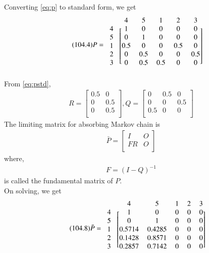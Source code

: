 \documentclass[journal,12pt,twocolumn]{IEEEtran}
\begin{document}
Converting \eqref{eq:p} to standard form, we get
\begin{align}
\tag{104.4}
\label{eq:pstd}
    P=\begin{blockarray}{cccccc}
&4 & 5 & 1 & 2 & 3 \\
\begin{block}{c[ccccc]}
  4 & 1 & 0 & 0 & 0 & 0 \\
  5 & 0 & 1 & 0 & 0 & 0 \\
  1 & 0.5 & 0 & 0 & 0.5 & 0 \\
  2 & 0 & 0.5 & 0 & 0 & 0.5 \\
  3 & 0 & 0.5 & 0.5 & 0 & 0 \\
\end{block}
\end{blockarray}
\end{align}
From \eqref{eq:pstd},
\begin{align}
\tag{104.5}
\label{eq:r,q}
    R=\begin{bmatrix}
    0.5 & 0\\
    0 & 0.5\\
    0 & 0.5\\
    \end{bmatrix},
    Q=\begin{bmatrix}
    0 & 0.5 & 0\\
    0 & 0 & 0.5\\
    0.5 & 0 & 0\\
    \end{bmatrix}
\end{align}
\newpage
The limiting matrix for absorbing Markov chain is
\begin{align}
\tag{104.6}
\label{eq:pbar}
    \bar P=\begin{bmatrix}
    I & O\\
    FR & O\\
    \end{bmatrix}
\end{align}
where,
\begin{align}
\tag{104.7}
\label{eq:f}
    F=(I-Q)^{-1}
\end{align}
is called the fundamental matrix of $P$. \\
On solving, we get
\begin{align}
\tag{104.8}
\label{eq:ans}
    \bar P=\begin{blockarray}{cccccc}
&4 & 5 & 1 & 2 & 3 \\
\begin{block}{c[ccccc]}
    4 & 1 & 0 & 0 & 0 & 0 \\
    5 & 0 & 1 & 0 & 0 & 0 \\
    1 & 0.5714 & 0.4285 & 0 & 0 & 0 \\
    2 & 0.1428 & 0.8571 & 0 & 0 & 0 \\
    3 & 0.2857 & 0.7142 & 0 & 0 & 0 \\
   \end{block}
\end{blockarray}
\end{align}
\end{document}
